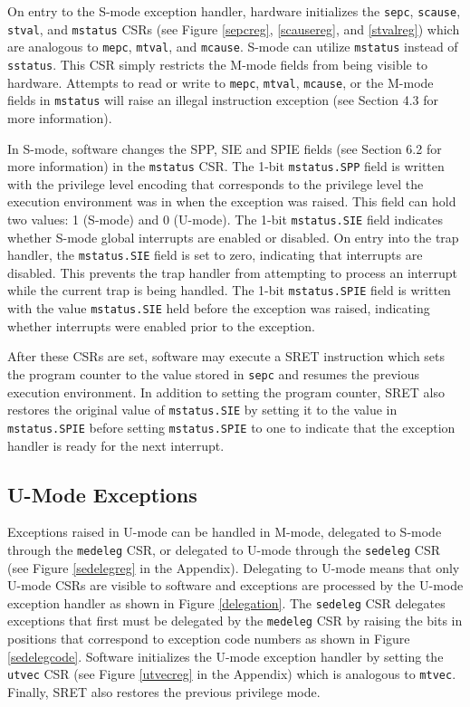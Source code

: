 \documentclass[12pt]{article}
\begin{document}
On entry to the S-mode exception handler, hardware initializes the {\tt{sepc}}, {\tt{scause}}, {\tt{stval}}, and {\tt{mstatus}} CSRs (see Figure \ref{sepcreg}, \ref{scausereg}, and \ref{stvalreg}) which are analogous to {\tt{mepc}}, {\tt{mtval}}, and {\tt{mcause}}. S-mode can utilize {\tt{mstatus}} instead of {\tt{sstatus}}. This CSR simply restricts the M-mode fields from being visible to hardware. Attempts to read or write to {\tt{mepc}}, {\tt{mtval}}, {\tt{mcause}}, or the M-mode fields in {\tt{mstatus}} will raise an illegal instruction exception (see Section 4.3 for more information).

In S-mode, software changes the SPP, SIE and SPIE fields (see Section 6.2 for more information) in the {\tt{mstatus}} CSR. The 1-bit {\tt{mstatus.SPP}} field is written with the privilege level encoding that corresponds to the privilege level the execution environment was in when the exception was raised. This field can hold two values: 1 (S-mode) and 0 (U-mode). The 1-bit {\tt{mstatus.SIE}} field indicates whether S-mode global interrupts are enabled or disabled. On entry into the trap handler, the {\tt{mstatus.SIE}} field is set to zero, indicating that interrupts are disabled. This prevents the trap handler from attempting to process an interrupt while the current trap is being handled. The 1-bit {\tt{mstatus.SPIE}} field is written with the value {\tt{mstatus.SIE}} held before the exception was raised, indicating whether interrupts were enabled prior to the exception.

After these CSRs are set, software may execute a SRET instruction which sets the program counter to the value stored in {\tt{sepc}} and resumes the previous execution environment. In addition to setting the program counter, SRET also restores the original value of {\tt{mstatus.SIE}} by setting it to the value in {\tt{mstatus.SPIE}} before setting {\tt{mstatus.SPIE}} to one to indicate that the exception handler is ready for the next interrupt.
 
\subsection{U-Mode Exceptions}
Exceptions raised in U-mode can be handled in M-mode, delegated to S-mode through the {\tt{medeleg}} CSR, or delegated to U-mode through the {\tt{sedeleg}} CSR (see Figure \ref{sedelegreg} in the Appendix). Delegating to U-mode means that only U-mode CSRs are visible to software and exceptions are processed by the U-mode exception handler as shown in Figure \ref{delegation}. The {\tt{sedeleg}} CSR delegates exceptions that first must be delegated by the {\tt{medeleg}} CSR by raising the bits in positions that correspond to exception code numbers as shown in Figure \ref{sedelegcode}. Software initializes the U-mode exception handler by setting the {\tt{utvec}} CSR (see Figure \ref{utvecreg} in the Appendix) which is analogous to {\tt{mtvec}}. Finally, SRET also restores the previous privilege mode.
\end{document}
